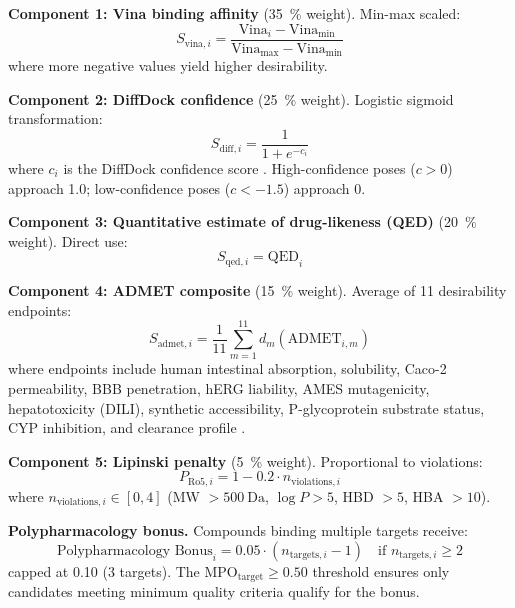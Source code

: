 \documentclass[journal=jcisd8,manuscript=suppinfo]{achemso}
\begin{document}
\textbf{Component 1: Vina binding affinity} (\qty{35}{\percent} weight). Min-max scaled:
\begin{equation}
S_{\text{vina}, i} = \frac{\text{Vina}_i - \text{Vina}_{\min}}{\text{Vina}_{\max} - \text{Vina}_{\min}}
\label{eq:sm_vina}
\end{equation}
where more negative values yield higher desirability.

\textbf{Component 2: DiffDock confidence} (\qty{25}{\percent} weight). Logistic sigmoid transformation:
\begin{equation}
S_{\text{diff}, i} = \frac{1}{1 + e^{-c_i}}
\label{eq:sm_diffdock}
\end{equation}
where $c_i$ is the DiffDock confidence score \cite{Corso2023}. High-confidence poses ($c > \num{0}$) approach \num{1.0}; low-confidence poses ($c < \num{-1.5}$) approach \num{0}.

\textbf{Component 3: Quantitative estimate of drug-likeness (QED)} (\qty{20}{\percent} weight). Direct use:
\begin{equation}
S_{\text{qed}, i} = \text{QED}_i
\label{eq:sm_qed}
\end{equation}

\textbf{Component 4: ADMET composite} (\qty{15}{\percent} weight). Average of 11 desirability endpoints:
\begin{equation}
S_{\text{admet}, i} = \frac{1}{11} \sum_{m=1}^{11} d_m(\text{ADMET}_{i,m})
\label{eq:sm_admet}
\end{equation}
where endpoints include human intestinal absorption, solubility, Caco-2 permeability, BBB penetration, hERG liability, AMES mutagenicity, hepatotoxicity (DILI), synthetic accessibility, P-glycoprotein substrate status, CYP inhibition, and clearance profile \cite{Swanson2024}.

\textbf{Component 5: Lipinski penalty} (\qty{5}{\percent} weight). Proportional to violations:
\begin{equation}
P_{\text{Ro5}, i} = 1 - 0.2 \cdot n_{\text{violations}, i}
\label{eq:sm_ro5}
\end{equation}
where $n_{\text{violations}, i} \in [0,4]$ (MW $> \qty{500}{\dalton}$, $\log P > \num{5}$, HBD $> \num{5}$, HBA $> \num{10}$).

\textbf{Polypharmacology bonus.} Compounds binding multiple targets receive:
\begin{equation}
\text{Polypharmacology Bonus}_i = 0.05 \cdot (n_{\text{targets}, i} - 1) \quad \text{if } n_{\text{targets}, i} \geq 2
\label{eq:sm_poly}
\end{equation}
capped at \num{+0.10} (3 targets). The $\text{MPO}_{\text{target}} \geq \num{0.50}$ threshold ensures only candidates meeting minimum quality criteria qualify for the bonus.
\end{document}
